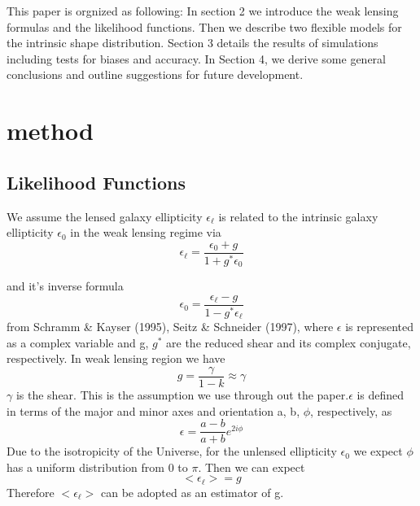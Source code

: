 \documentclass[useAMS,usenatbib]{mn2e}
\begin{document}
This paper is orgnized as following: In section 2 we introduce the
weak lensing formulas and the likelihood functions. Then we describe
two flexible models for the intrinsic shape distribution. Section 3 details
the results of simulations including tests for biases and accuracy. In Section 4, we
derive some general conclusions and outline suggestions for future
development.




\section{method}

\label{sec:XXX}


\subsection{Likelihood Functions}

We assume the lensed galaxy ellipticity $\epsilon_{\ell}$ is related
to the intrinsic galaxy ellipticity $\epsilon_{0}$ in the weak lensing
regime via 
\begin{equation}
\epsilon_{\ell}=\frac{\epsilon_{0}+g}{1+g^{*}\epsilon_{0}}
\end{equation}


and it's inverse formula 
\begin{equation}
\epsilon_{0}=\frac{\epsilon_{\ell}-g}{1-g^{*}\epsilon_{\ell}}
\end{equation}
from Schramm \& Kayser (1995), Seitz \& Schneider (1997), where $\epsilon$
is represented as a complex variable and g, $g^{*}$ are the reduced
shear and its complex conjugate, respectively. In weak lensing region we have 
\begin{equation}
g=\frac{\gamma}{1-k}\approx\gamma
\end{equation}
$\gamma$ is the shear. This is the assumption we use through out
the paper.$\epsilon$ is defined in terms of the major and minor axes and orientation a, b, $\phi$,
respectively, as
\begin{equation}
\epsilon=\frac{a-b}{a+b}e^{2i\phi}
\end{equation}
Due to the isotropicity of the Universe, for the unlensed ellipticity $\epsilon_{0}$ 
we expect $\phi$ has a uniform distribution
from 0 to $\pi$. Then we can expect 
\begin{equation}
<\epsilon_{\ell}>=g
\end{equation}
Therefore $<\epsilon_{\ell}>$ can be adopted as an estimator of g.
\end{document}
